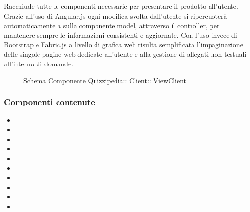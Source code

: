 \subsection{}
Racchiude tutte le componenti necessarie per presentare il prodotto all'utente.
Grazie all'uso di Angular.js ogni modifica svolta dall'utente si ripercuoterà automaticamente a sulla componente model, attraverso il controller, per mantenere sempre le informazioni consistenti e aggiornate.
Con l'uso invece di Bootstrap e Fabric.js a livello di grafica web risulta semplificata l'impaginazione delle singole pagine web dedicate all'utente e alla gestione di allegati non testuali all'interno di domande.
\begin{figure}[H]
\centering
\noindent{}
\caption[Schema Componente ViewClient]{Schema Componente Quizzipedia:: Client:: ViewClient}
\end{figure}
\subsubsection{Componenti contenute}
\begin{itemize}
\item {}
\item {}
\item {}
\item {}
\item {}
\item {}
\item {}
\item {}
\item {}
\item {}
\end{itemize}
